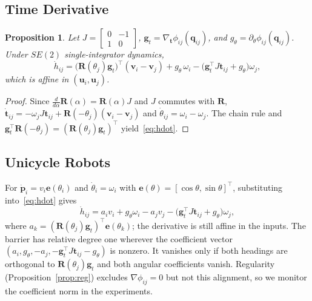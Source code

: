 \documentclass[journal]{IEEEtran}
\newtheorem{proposition}{Proposition}
\theoremstyle{definition}
\newcommand{\Rot}{\mathbf{R}}
\begin{document}
\subsection{Time Derivative}
\begin{proposition}\label{prop:hdot}
Let $J=\left[\begin{smallmatrix}0&-1\\1&0\end{smallmatrix}\right]$,
$\mathbf g_t=\nabla_{\mathbf t}\phi_{ij}(\mathbf q_{ij})$, and
$g_\theta=\partial_\theta\phi_{ij}(\mathbf q_{ij})$. Under $SE(2)$ single-integrator dynamics,
\begin{equation}\label{eq:hdot}
\dot h_{ij}=\big(\Rot(\theta_j)\mathbf g_t\big)^{\!\top}(\mathbf v_i-\mathbf v_j)
+g_\theta\,\omega_i-\big(\mathbf g_t^{\top}J\mathbf t_{ij}+g_\theta\big)\omega_j ,
\end{equation}
which is affine in $(\mathbf u_i,\mathbf u_j)$.
\end{proposition}
\begin{proof}
Since $\tfrac{d}{d\alpha}\Rot(\alpha)=\Rot(\alpha)J$ and $J$ commutes with $\Rot$,
$\dot{\mathbf t}_{ij}=-\omega_jJ\mathbf t_{ij}+\Rot(-\theta_j)(\mathbf v_i-\mathbf v_j)$ and
$\dot\theta_{ij}=\omega_i-\omega_j$. The chain rule and
$\mathbf g_t^\top\Rot(-\theta_j)=(\Rot(\theta_j)\mathbf g_t)^\top$ yield~\eqref{eq:hdot}.
\end{proof}

\subsection{Unicycle Robots}\label{sec:unicycle-model}
For $\dot{\mathbf p}_i=v_i\mathbf e(\theta_i)$ and $\dot\theta_i=\omega_i$ with
$\mathbf e(\theta)=[\cos\theta,\sin\theta]^\top$, substituting into~\eqref{eq:hdot} gives
\begin{equation}\label{eq:hdot-uni}
\dot h_{ij}=a_i v_i+g_\theta\omega_i-a_jv_j-\big(\mathbf g_t^\top J\mathbf t_{ij}+g_\theta\big)\omega_j,
\end{equation}
where $a_k=(\Rot(\theta_j)\mathbf g_t)^{\top}\mathbf e(\theta_k)$; the derivative is still affine in
the inputs. The barrier has relative degree one wherever the coefficient vector
$(a_i,g_\theta,-a_j,-\mathbf g_t^\top J\mathbf t_{ij}-g_\theta)$ is nonzero. It vanishes only if both
headings are orthogonal to $\Rot(\theta_j)\mathbf g_t$ and both angular coefficients vanish.
Regularity (Proposition~\ref{prop:reg}) excludes $\nabla\phi_{ij}=0$ but not this alignment, so we
monitor the coefficient norm in the experiments.
\end{document}
